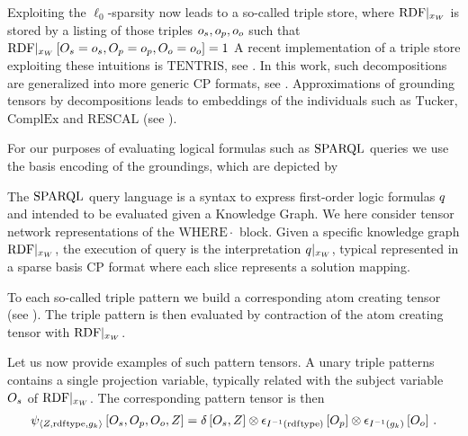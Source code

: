 Exploiting the $\ell_0$-sparsity now leads to a so-called triple store, where ${\mathrm{RDF}}|_{x_{W}}$ is stored by a listing of those triples $o_{s},o_{p},o_{o}$ such that ${\mathrm{RDF}}|_{x_{W}}\left[O_{s}=o_{s}, O_{p}=o_{p}, O_{o}=o_{o}\right]=1$
A recent implementation of a triple store exploiting these intuitions is $\mathrm{TENTRIS}$, see \cite{pan_tentris_2020}.
In this work, such decompositions are generalized into more generic CP formats, see .
Approximations of grounding tensors by decompositions leads to embeddings of the individuals such as $\mathrm{Tucker}$, $\mathrm{ComplEx}$ and $\mathrm{RESCAL}$ (see \cite{nickel_review_2016}).



For our purposes of evaluating logical formulas such as $\mathrm{SPARQL}$ queries we use the basis encoding of the groundings, which are depicted by
\begin{center}
    
\end{center}





The $\mathrm{SPARQL}$ query language is a syntax to express first-order logic formulas $q$ and intended to be evaluated given a Knowledge Graph.
We here consider tensor network representations of the $\mathrm{WHERE}{\cdot}$ block.
Given a specific knowledge graph ${\mathrm{RDF}}|_{x_{W}}$, the execution of query is the interpretation ${q}|_{x_{W}}$, typical represented in a sparse basis CP format where each slice represents a solution mapping.


To each so-called triple pattern we build a corresponding atom creating tensor (see ).
The triple pattern is then evaluated by contraction of the atom creating tensor with ${\mathrm{RDF}}|_{x_{W}}$.

Let us now provide examples of such pattern tensors.
A unary triple patterns contains a single projection variable, typically related with the subject variable $O_{s}$ of ${\mathrm{RDF}}|_{x_{W}}$.
The corresponding pattern tensor is then
\begin{align*}
    \psi_{\braket{Z,\mathrm{rdf}\mathrm{type},g_{k}}}\left[
        O_{s}, O_{p}, O_{o}, Z
    \right]
    = \delta\left[O_{s},Z\right]
    \otimes \epsilon_{I^{-1}(\mathrm{rdf}\mathrm{type})}\left[O_{p}\right]
    \otimes \epsilon_{I^{-1}(g_{k})}\left[O_{o}\right] \, .
\end{align*}


